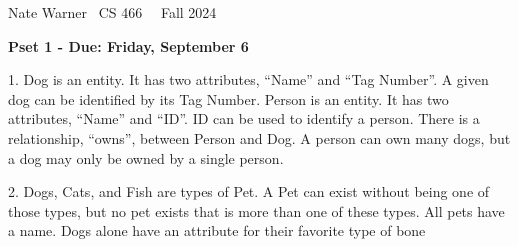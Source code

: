 \documentclass{report}
\title{\Huge{}}
\author{\huge{Nathan Warner}}
\date{\huge{}}
\begin{document}
    \pagebreak \bigbreak \noindent
    Nate Warner \ \quad \quad \quad \quad \quad \quad \quad \quad \quad \quad \quad \quad  CS 466 \quad  \quad \quad \quad \quad \quad \quad \quad \quad \ \ \quad \quad Fall 2024
    \begin{center}
        \textbf{Pset 1 - Due: Friday, September 6}
    \end{center}
    \bigbreak \noindent 
    \begin{mdframed}
        1. Dog is an entity. It has two attributes, “Name” and “Tag Number”. A given dog can be identified by its Tag Number. Person is an entity. It has
two attributes, “Name” and “ID”. ID can be used to identify a person. There is a relationship, “owns”, between Person and Dog. A person can
own many dogs, but a dog may only be owned by a single person.
    \end{mdframed}
    \bigbreak \noindent 
\begin{figure}[ht]
    \centering
    \label{fig:1}
\end{figure}

\bigbreak \noindent 
\begin{mdframed}
    2. Dogs, Cats, and Fish are types of Pet. A Pet can exist without being one of those types, but no pet exists that is more than one of these types. All
pets have a name. Dogs alone have an attribute for their favorite type of bone
\end{mdframed}
\bigbreak \noindent 
\begin{figure}[ht]
    \centering
    \label{fig:2}
\end{figure}
\end{document}
